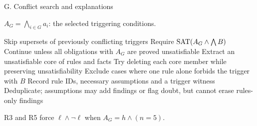 \documentclass[aspectratio=169,11pt]{beamer}
\begin{document}
\begin{frame}[noframenumbering,label=app-g]{G. Conflict search and explanations}
\backuptext
{\small $A_G=\bigwedge_{i\in G}a_i$: the selected triggering conditions.\par}
\begin{algorithmic}[1]
  \State Skip supersets of previously conflicting triggers
  \State Require $\operatorname{SAT}(A_G\land\bigwedge B)$
  \State Continue unless all obligations with $A_G$ are proved unsatisfiable
  \State Extract an unsatisfiable core of rules and facts
  \State Try deleting each core member while preserving unsatisfiability
  \State Exclude cases where one rule alone forbids the trigger with $B$
  \State Record rule IDs, necessary assumptions and a trigger witness
 \EndFor
\EndFor
\State Deduplicate; assumptions may add findings or flag doubt, but cannot erase rules-only findings
\end{algorithmic}
\vspace{0mm}
R3 and R5 force $\ell\land\neg\ell$ when $A_G=h\land(n=5)$.\hfill{}
\end{frame}
\end{document}
